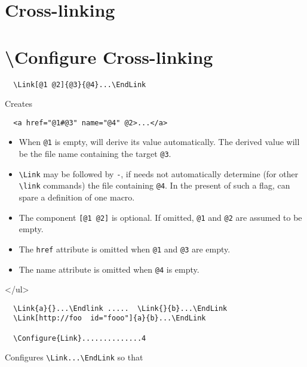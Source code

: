 \documentclass[a4paper]{article}
\begin{document}
\section{Cross-linking}
\else
\section{\textbackslash{}Configure Cross-linking}
\fi

\begin{verbatim}
  \Link[@1 @2]{@3}{@4}...\EndLink
\end{verbatim}

\noindent  Creates

\begin{verbatim}
  <a href="@1#@3" name="@4" @2>...</a>
\end{verbatim}

\begin{itemize}
\item   When \Verb=@1= is empty, \texht will derive its value automatically.
    The derived value will be the file name containing the target \Verb=@3=.

  \item  \Verb=\Link= may be followed by \Verb=-=, if \texht needs not automatically
    determine (for other \Verb=\link= commands) the file containing \Verb=@4=.
    In the present of such a flag, \texht can spare a definition of
    one macro.

  \item The component \Verb=[@1 @2]= is optional. If omitted,
    \Verb=@1= and \Verb=@2= are  assumed to be empty.

  \item  The \Verb=href= attribute is omitted when \Verb=@1= and
    \Verb=@3= are empty. 

  \item  The name attribute is omitted when \Verb=@4= is empty.
  
\end{itemize}
\ifx\cvrtexht\undefined\else\Tg</ul>\fi

  \Example

\begin{verbatim}
  \Link{a}{}...\Endlink .....  \Link{}{b}...\EndLink
  \Link[http://foo  id="fooo"]{a}{b}...\EndLink

  \Configure{Link}..............4
\end{verbatim}

\noindent   Configures \Verb=\Link...\EndLink= so that
\end{document}
